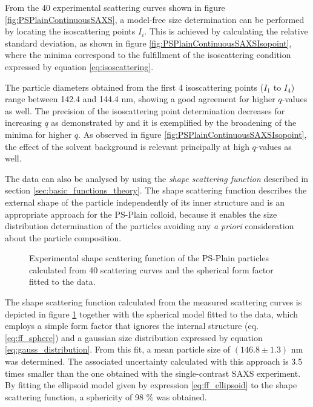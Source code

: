 From the 40 experimental scattering curves shown in figure \ref{fig:PSPlainContinuousSAXS}, a model-free size determination can be performed by locating the isoscattering points $I_i$. This is achieved by calculating the relative standard deviation, as shown in figure \ref{fig:PSPlainContinuousSAXSIsopoint}, where the minima correspond to the fulfillment of the isoscattering condition expressed by equation \ref{eq:isoscattering}.

The particle diameters obtained from the first 4 isoscattering points ($I_1$ to $I_4$) range between 142.4 and 144.4 nm, showing a good agreement for higher $q$-values as well. The precision of the isoscattering point determination decreases for increasing $q$ as demonstrated by \cite{kawaguchi_isoscattering_1992} and it is exemplified by the broadening of the minima for higher $q$. As observed in figure \ref{fig:PSPlainContinuousSAXSIsopoint}, the effect of the solvent background is relevant principally at high $q$-values as well.

The data can also be analysed by using the \emph{shape scattering function} described in section \ref{sec:basic_functions_theory}. The shape scattering function describes the external shape of the particle independently of its inner structure and is an appropriate approach for the PS-Plain colloid, because it enables the size distribution determination of the particles avoiding any \emph{a priori} consideration about the particle composition.

\begin{figure}
	\begin{center}
		
	\end{center}
	\caption[Experimental shape scattering function of the PS-Plain particles.]{Experimental shape scattering function of the PS-Plain particles calculated from 40 scattering curves and the spherical form factor fitted to the data.}
	\label{fig:PSPlainResonantTerm}
\end{figure}

The shape scattering function calculated from the measured scattering curves is depicted in figure \ref{fig:PSPlainResonantTerm} together with the spherical model fitted to the data, which employs a simple form factor that ignores the internal structure (eq. \ref{eq:ff_sphere}) and a gaussian size distribution expressed by equation \ref{eq:gauss_distribution}. From this fit, a mean particle size of $(146.8\pm1.3)$ nm was determined. The associated uncertainty calculated with this approach is 3.5 times smaller than the one obtained with the single-contrast SAXS experiment. By fitting the ellipsoid model given by expression \ref{eq:ff_ellipsoid} to the shape scattering function, a sphericity of 98 $\%$ was obtained.

